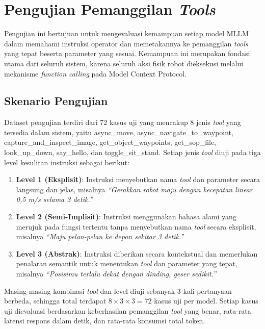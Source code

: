 \section{Pengujian Pemanggilan \textit{Tools}}
\label{sec:pengujian_tools}

Pengujian ini bertujuan untuk mengevaluasi kemampuan setiap model MLLM dalam memahami instruksi operator dan memetakannya ke pemanggilan \textit{tools} yang tepat beserta parameter yang sesuai. Kemampuan ini merupakan fondasi utama dari seluruh sistem, karena seluruh aksi fisik robot dieksekusi melalui mekanisme \textit{function calling} pada Model Context Protocol.

\subsection{Skenario Pengujian}
Dataset pengujian terdiri dari 72 kasus uji yang mencakup 8 jenis \textit{tool} yang tersedia dalam sistem, yaitu async\_move, async\_navigate\_to\_waypoint, capture\_and\_inspect\_image, get\_object\_waypoints, get\_sop\_file, look\_up\_down, say\_hello, dan toggle\_sit\_stand. Setiap jenis \textit{tool} diuji pada tiga level kesulitan instruksi sebagai berikut:

\begin{enumerate}
    \item \textbf{Level 1 (Eksplisit)}: Instruksi menyebutkan nama \textit{tool} dan parameter secara langsung dan jelas, misalnya \textit{``Gerakkan robot maju dengan kecepatan linear 0,5 m/s selama 3 detik.''}
    \item \textbf{Level 2 (Semi-Implisit)}: Instruksi menggunakan bahasa alami yang merujuk pada fungsi tertentu tanpa menyebutkan nama \textit{tool} secara eksplisit, misalnya \textit{``Maju pelan-pelan ke depan sekitar 3 detik.''}
    \item \textbf{Level 3 (Abstrak)}: Instruksi diberikan secara kontekstual dan memerlukan penalaran semantik untuk menentukan \textit{tool} dan parameter yang tepat, misalnya \textit{``Posisimu terlalu dekat dengan dinding, geser sedikit.''}
\end{enumerate}

Masing-masing kombinasi \textit{tool} dan level diuji sebanyak 3 kali pertanyaan berbeda, sehingga total terdapat $8 \times 3 \times 3 = 72$ kasus uji per model. Setiap kasus uji dievaluasi berdasarkan keberhasilan pemanggilan \textit{tool} yang benar, rata-rata latensi respons dalam detik, dan rata-rata konsumsi total token.

